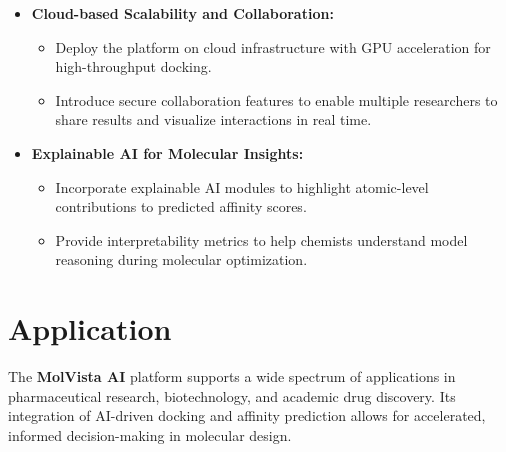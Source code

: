 \documentclass[12pt,a4]{report}
\begin{document}
\begin{itemize}
    \item \textbf{Cloud-based Scalability and Collaboration:}
    \begin{itemize}
        \item Deploy the platform on cloud infrastructure with GPU acceleration for high-throughput docking.
        \item Introduce secure collaboration features to enable multiple researchers to share results and visualize interactions in real time.
    \end{itemize}

    \item \textbf{Explainable AI for Molecular Insights:}
    \begin{itemize}
        \item Incorporate explainable AI modules to highlight atomic-level contributions to predicted affinity scores.
        \item Provide interpretability metrics to help chemists understand model reasoning during molecular optimization.
    \end{itemize}
\end{itemize}

\vspace{0.3cm}

\section{Application}
\vspace{0.2cm}
\hspace{0.3in}The \textbf{MolVista AI} platform supports a wide spectrum of applications in pharmaceutical research, biotechnology, and academic drug discovery. Its integration of AI-driven docking and affinity prediction allows for accelerated, informed decision-making in molecular design.
\end{document}

